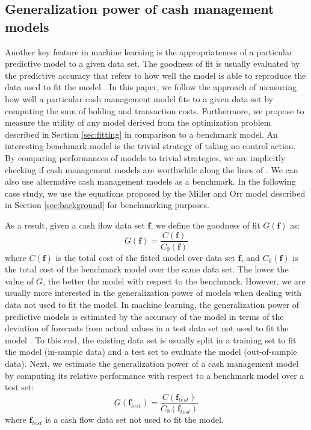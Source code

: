 \subsection{Generalization power of cash management models\label{sec:adapting}}

Another key feature in machine learning is the appropriateness of a particular predictive model to a given data set. The goodness of fit is usually evaluated by the predictive accuracy that refers to how well the model is able to reproduce the data used to fit the model \citep{makridakis2008forecasting}. In this paper, we follow the approach of measuring how well a particular cash management model fits to a given data set by computing the sum of holding and transaction costs. Furthermore, we propose to measure the utility of any model derived from the optimization problem described in Section \ref{sec:fitting} in comparison to a benchmark model. An interesting benchmark model is the trivial strategy of taking no control action. By comparing performances of models to trivial strategies, we are implicitly checking if cash management models are worthwhile along the lines of \cite{daellenbach1974cash}. We can also use alternative cash management models as a benchmark. In the following case study, we use the equations proposed by the Miller and Orr model described in Section \ref{sec:background} for benchmarking purposes. 

As a result, given a cash flow data set $\boldsymbol{f}$, we define the goodness of fit $G(\boldsymbol{f})$ as:
\begin{equation}
G(\boldsymbol{f}) = \frac{C(\boldsymbol{f})}{C_0(\boldsymbol{f})}
\label{eq:genpower1}
\end{equation}
where $C(\boldsymbol{f})$ is the total cost of the fitted model over data set $\boldsymbol{f}$, and $C_0(\boldsymbol{f})$ is the total cost of the benchmark model over the same data set. The lower the value of $G$, the better the model with respect to the benchmark. However, we are usually more interested in the generalization power of models when dealing with data not used to fit the model. In machine learning, the generalization power of predictive models is estimated by the accuracy of the model in terms of the deviation of forecasts from actual values in a test data set not used to fit the model \citep{makridakis2008forecasting,provost2013data}. To this end, the existing data set is usually split in a training set to fit the model (in-sample data) and a test set to evaluate the model (out-of-sample data). Next, we estimate the generalization power of a cash management model by computing its relative performance with respect to a benchmark model over a test set:
\begin{equation}
G(\boldsymbol{f}_{test}) = \frac{C(\boldsymbol{f}_{test})}{C_0(\boldsymbol{f}_{test})}
\label{eq:genpower2}
\end{equation}
where $\boldsymbol{f}_{test}$ is a cash flow data set not used to fit the model. 

